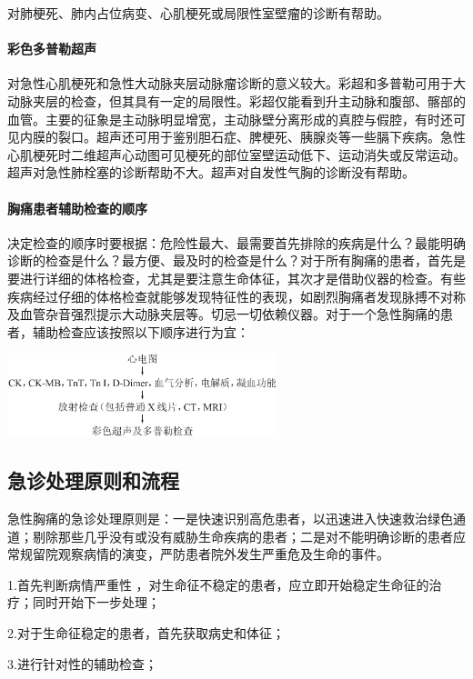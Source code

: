 对肺梗死、肺内占位病变、心肌梗死或局限性室壁瘤的诊断有帮助。

\paragraph{彩色多普勒超声}

对急性心肌梗死和急性大动脉夹层动脉瘤诊断的意义较大。彩超和多普勒可用于大动脉夹层的检查，但其具有一定的局限性。彩超仅能看到升主动脉和腹部、髂部的血管。主要的征象是主动脉明显增宽，主动脉壁分离形成的真腔与假腔，有时还可见内膜的裂口。超声还可用于鉴别胆石症、脾梗死、胰腺炎等一些膈下疾病。急性心肌梗死时二维超声心动图可见梗死的部位室壁运动低下、运动消失或反常运动。超声对急性肺栓塞的诊断帮助不大。超声对自发性气胸的诊断没有帮助。

\paragraph{胸痛患者辅助检查的顺序}

决定检查的顺序时要根据：危险性最大、最需要首先排除的疾病是什么？最能明确诊断的检查是什么？最方便、最及时的检查是什么？对于所有胸痛的患者，首先是要进行详细的体格检查，尤其是要注意生命体征，其次才是借助仪器的检查。有些疾病经过仔细的体格检查就能够发现特征性的表现，如剧烈胸痛者发现脉搏不对称及血管杂音强烈提示大动脉夹层等。切忌一切依赖仪器。对于一个急性胸痛的患者，辅助检查应该按照以下顺序进行为宜：

\includegraphics[width=3.09375in,height=0.94792in]{./images/Image00043.jpg}

\subsection{急诊处理原则和流程}

急性胸痛的急诊处理原则是：一是快速识别高危患者，以迅速进入快速救治绿色通道；剔除那些几乎没有或没有威胁生命疾病的患者；二是对不能明确诊断的患者应常规留院观察病情的演变，严防患者院外发生严重危及生命的事件。

1.首先判断病情严重性
，对生命征不稳定的患者，应立即开始稳定生命征的治疗；同时开始下一步处理；

2.对于生命征稳定的患者，首先获取病史和体征；

3.进行针对性的辅助检查；

